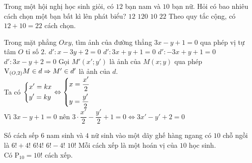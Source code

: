 \begin{ex}%
 Trong một hội nghị học sinh giỏi, có $12$ bạn nam và $10$ bạn nữ. Hỏi có bao nhiêu cách chọn một bạn bất kì lên phát biểu?
 \choice
  {$12$}
  {$120$}
  {$10$}
  {\True $22$}
 \loigiai
 {Theo quy tắc cộng, có $12+10=22$ cách chọn.
 }
\end{ex}

\begin{ex}%
 Trong mặt phẳng $Oxy$, tìm ảnh của đường thẳng $3x-y+1=0$ qua phép vị tự tâm $O$ tỉ số $2$.
 \choice
  {$d':x-3y+2=0$}
  {$d':3x+y+1=0$}
  {$d':-3x+y+1=0$}
  {\True $d': 3x-y+2=0$}
 \loigiai
 {Gọi $M'(x';y')$ là ảnh của $M(x;y)$ qua phép $\mathrm{V}_{\left(O,2\right)} \\
 M \in d \Rightarrow M' \in d'$ là ảnh của $d$.\\
 Ta có $\left\{\begin{aligned}&x'=kx \\ &y'=ky\end{aligned}\right. \Leftrightarrow \left\{\begin{aligned}&x=\dfrac{x'}{2} \\ &y=\dfrac{y'}{2}\end{aligned}\right.$\\
 Vì $3x-y+1=0$ nên $3 \cdot\dfrac{x'}{2}-\dfrac{y'}{2}+1=0 \Leftrightarrow 3x'-y'+2=0$
 }
\end{ex}

\begin{ex}%
 Số cách sếp $6$ nam sinh và $4$ nữ sinh vào một dãy ghế hàng ngang có $10$ chỗ ngồi là
 \choice
  {$6!+4!$}
  {$6!4!$}
  {$6!-4!$}
  {\True $10!$}
 \loigiai
 {Mỗi cách xếp là một hoán vị của $10$ học sinh.\\
 Có $\mathrm{P}_{10}=10!$ cách xếp.
 }
\end{ex}

